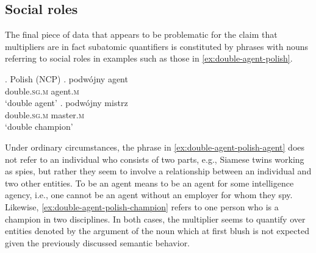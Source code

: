 \subsection{Social roles}\label{sec:social-roles}

The final piece of data that appears to be problematic for the claim that multipliers are in fact subatomic quantifiers is constituted by phrases with nouns referring to social roles in examples such as those in \ref{ex:double-agent-polish}. 

\ex. Polish (NCP)\label{ex:double-agent-polish}
\ag. podwójny agent\\
double\textsc{.sg.m} agent\textsc{.m}\\
`double agent'\label{ex:double-agent-polish-agent}
\bg. podwójny mistrz\\
double\textsc{.sg.m} master\textsc{.m}\\
`double champion'\label{ex:double-agent-polish-champion}

Under ordinary circumstances, the phrase in \ref{ex:double-agent-polish-agent} does not refer to an individual who consists of two parts, e.g., Siamese twins working as spies, but rather they seem to involve a relationship between an individual and two other entities. To be an agent means to be an agent for some intelligence agency, i.e., one cannot be an agent without an employer for whom they spy. Likewise, \ref{ex:double-agent-polish-champion} refers to one person who is a champion in two disciplines. In both cases, the multiplier seems to quantify over entities denoted by the argument of the noun which at first blush is not expected given the previously discussed semantic behavior.

